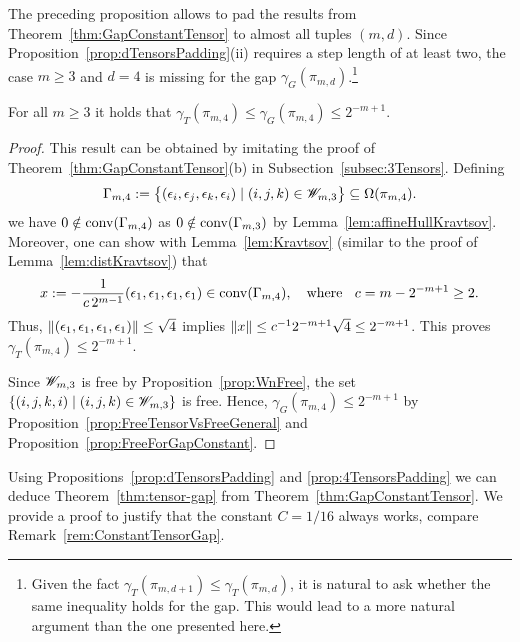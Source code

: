 The preceding proposition allows to pad the results from Theorem~\ref{thm:GapConstantTensor} to almost all tuples $(m,d)$. Since Proposition~\ref{prop:dTensorsPadding}(ii) requires a step length of at least two, the case $m \geq 3$ and $d=4$ is missing for the gap $\gamma_G(\pi_{m,d})$.\footnote{Given the fact $\gamma_{T}(\pi_{m,d+1}) \leq \gamma_{T}(\pi_{m,d})$, it is natural to ask whether the same inequality holds for the gap. This would lead to a more natural argument than the one presented here.}

\begin{prop} \label{prop:4TensorsPadding}
	For all $m \geq 3$ it holds that $\gamma_{T}(\pi_{m,4}) \leq \gamma_G(\pi_{m,4}) \leq 2^{-m+1}$.
\end{prop}

\begin{proof}
	This result can be obtained by imitating the proof of Theorem~\ref{thm:GapConstantTensor}(b) in Subsection~\ref{subsec:3Tensors}. Defining
	\begin{align*}
		\Gamma_{m,4} := \big\lbrace (\epsilon_i,\epsilon_j,\epsilon_k, \epsilon_i) \mid (i,j,k) \in \mathscr{W}_{m,3} \big\rbrace \subseteq \Omega(\pi_{m,4}).
	\end{align*}
	we have $0 \notin \operatorname{conv}(\Gamma_{m,4})$ as $0 \notin \operatorname{conv}(\Gamma_{m,3})$ by Lemma~\ref{lem:affineHullKravtsov}. Moreover, one can show with Lemma~\ref{lem:Kravtsov} (similar to the proof of Lemma~\ref{lem:distKravtsov}) that
	\begin{align*}
		x:= -\frac{1}{c \, 2^{m-1}} (\epsilon_1,\epsilon_1,\epsilon_1, \epsilon_1) \in \operatorname{conv}(\Gamma_{m,4}), \quad \text{where }\;\;
		c = m-2^{-m+1} \geq 2.
	\end{align*}
	Thus, $\lVert(\epsilon_1,\epsilon_1,\epsilon_1, \epsilon_1)\rVert \leq \sqrt{4}$ implies $\lVert x\rVert \leq c^{-1} 2^{-m+1} \sqrt{4} \leq 2^{-m+1}$. This proves $\gamma_{T}(\pi_{m,4}) \leq 2^{-m+1}$.
	
	Since $\mathscr{W}_{m,3}$ is free by Proposition~\ref{prop:WnFree}, the set $\lbrace (i,j,k,i) \mid (i,j,k) \in \mathscr{W}_{m,3} \rbrace$ is free. Hence, $\gamma_{G}(\pi_{m,4}) \leq 2^{-m+1}$ by Proposition~\ref{prop:FreeTensorVsFreeGeneral} and Proposition~\ref{prop:FreeForGapConstant}.
\end{proof}

Using Propositions~\ref{prop:dTensorsPadding} and \ref{prop:4TensorsPadding} we can deduce Theorem~\ref{thm:tensor-gap} from Theorem~\ref{thm:GapConstantTensor}. We provide a proof to justify that the constant $C = 1/16$ always works, compare Remark~\ref{rem:ConstantTensorGap}.

